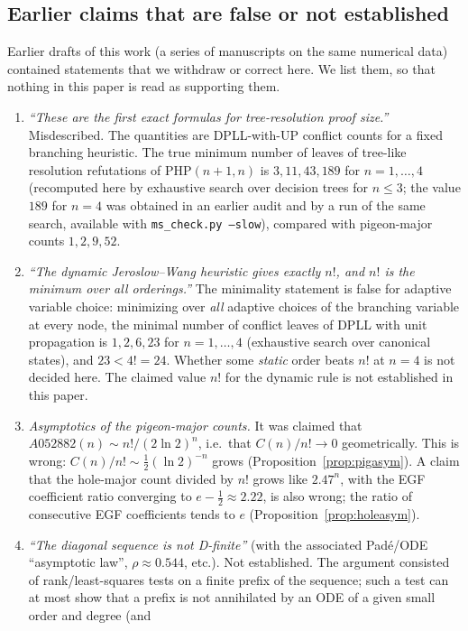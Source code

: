 \documentclass[11pt]{article}
\theoremstyle{definition}
\theoremstyle{remark}
\newcommand{\PHP}{\mathrm{PHP}}
\begin{document}
\subsection{Earlier claims that are false or not established}\label{sec:errata}
Earlier drafts of this work (a series of manuscripts on the same numerical data) contained statements that we
withdraw or correct here. We list them, so that nothing in this paper is read as supporting them.
\begin{enumerate}
\item \emph{``These are the first exact formulas for tree-resolution proof size.''} Misdescribed. The
  quantities are DPLL-with-UP conflict counts for a fixed branching heuristic. The true minimum number of
  leaves of tree-like resolution refutations of $\PHP(n{+}1,n)$ is $3,11,43,189$ for $n=1,\dots,4$
  (recomputed here by exhaustive search over decision trees for $n\le3$; the value $189$ for $n=4$ was obtained in an
  earlier audit and by a run of the same search, available with \texttt{ms\_check.py --slow}), compared with
  pigeon-major counts $1,2,9,52$.
\item \emph{``The dynamic Jeroslow--Wang heuristic gives exactly $n!$, and $n!$ is the minimum over all
  orderings.''} The minimality statement is false for adaptive variable choice: minimizing over \emph{all} adaptive
  choices of the branching variable at every node, the minimal number of conflict leaves of DPLL with
  unit propagation is $1,2,6,23$ for $n=1,\dots,4$ (exhaustive search over canonical states), and $23<4!=24$.
  Whether some \emph{static} order beats $n!$ at $n=4$ is not decided here. The claimed value $n!$ for the dynamic rule is not
  established in this paper.
\item \emph{Asymptotics of the pigeon-major counts.} It was claimed that $A052882(n)\sim n!/(2\ln2)^n$, i.e.\ that
  $C(n)/n!\to0$ geometrically. This is wrong: $C(n)/n!\sim\tfrac12(\ln2)^{-n}$ grows (Proposition~\ref{prop:pigasym}). A
  claim that the hole-major count divided by $n!$ grows like $2.47^n$, with the EGF coefficient ratio converging to $e-\tfrac12\approx2.22$, is also wrong; the
  ratio of consecutive EGF coefficients tends to $e$ (Proposition~\ref{prop:holeasym}).
\item \emph{``The diagonal sequence is not D-finite''} (with the associated Pad\'e/ODE ``asymptotic law'',
  $\rho\approx0.544$, etc.). Not established. The argument consisted of rank/least-squares tests on a finite prefix of the
  sequence; such a test can at most show that a prefix is not annihilated by an ODE of a given small order and degree (and

\end{enumerate}
\end{document}
